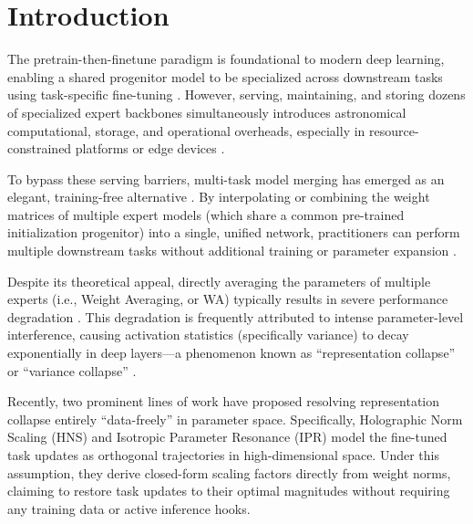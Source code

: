 \documentclass{article}
\begin{document}
\section{Introduction}
\label{sec:intro}

The pretrain-then-finetune paradigm is foundational to modern deep learning, enabling a shared progenitor model to be specialized across downstream tasks using task-specific fine-tuning \cite{he2016deep, vaswani2017attention}. However, serving, maintaining, and storing dozens of specialized expert backbones simultaneously introduces astronomical computational, storage, and operational overheads, especially in resource-constrained platforms or edge devices \cite{brown2020language}.

To bypass these serving barriers, multi-task model merging has emerged as an elegant, training-free alternative \cite{wortsman2022model, ilharco2022editing}. By interpolating or combining the weight matrices of multiple expert models (which share a common pre-trained initialization progenitor) into a single, unified network, practitioners can perform multiple downstream tasks without additional training or parameter expansion \cite{yadav2023ties, tokuda2024dae}.

Despite its theoretical appeal, directly averaging the parameters of multiple experts (i.e., Weight Averaging, or WA) typically results in severe performance degradation \cite{choshen2022fusing}. This degradation is frequently attributed to intense parameter-level interference, causing activation statistics (specifically variance) to decay exponentially in deep layers—a phenomenon known as ``representation collapse'' or ``variance collapse'' \cite{jordan2023repair, submission3}.

Recently, two prominent lines of work have proposed resolving representation collapse entirely ``data-freely'' in parameter space. Specifically, Holographic Norm Scaling (HNS) \cite{submission7} and Isotropic Parameter Resonance (IPR) \cite{submission9} model the fine-tuned task updates as orthogonal trajectories in high-dimensional space. Under this assumption, they derive closed-form scaling factors directly from weight norms, claiming to restore task updates to their optimal magnitudes without requiring any training data or active inference hooks.
\end{document}
